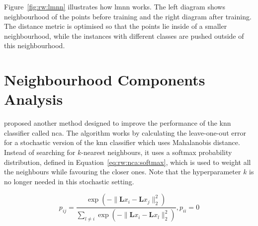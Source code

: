 \documentclass[12pt,a4paper]{report}
\begin{document}
Figure~\ref{fig:rw:lmnn} illustrates how \ac{lmnn} works. The left diagram shows neighbourhood of the points before training and the right diagram after training. The distance metric is optimised so that the points lie inside of a smaller neighbourhood, while the instances with different classes are pushed outside of this neighbourhood.






\section{Neighbourhood Components Analysis} \label{chap:rw:nca}
\citep{jacobgoldberger2004neighbourhood} proposed another method designed to improve the performance of the \ac{knn} classifier called \acf{nca}. The algorithm works by calculating the leave-one-out error for a stochastic version of the \ac{knn} classifier which uses Mahalanobis distance. Instead of searching for $k$-nearest neighbours, it uses a softmax probability distribution, defined in Equation~\ref{eq:rw:nca:softmax}, which is used to weight all the neighbours while favouring the closer ones. Note that the hyperparameter $k$ is no longer needed in this stochastic setting.

\begin{equation}
p_{ij} = \frac{ \exp(-\lVert \bm{L}x_i-\bm{L}x_j \rVert_2^2) }{ \sum_{l \neq i} \exp(-\lVert \bm{L}x_i-\bm{L}x_l \rVert_2^2) }, p_{ii}=0 \label{eq:rw:nca:softmax}
\end{equation}
\end{document}
